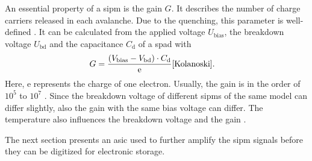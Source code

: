 


An essential property of a \ac{sipm} is the gain $G$.
It describes the number of charge carriers released in each avalanche.
Due to the quenching, this parameter is well-defined \cite{HamamatsuMPPCLit}.
It can be calculated from the applied voltage $U_\text{bias}$, the breakdown voltage $U_\text{bd}$ and the capacitance $C_\text{d}$ of a \ac{spad} with
\begin{align}
	G &= \frac{(V_\text{bias}- V_\text{bd})\cdot C_\text{d}}{\text{e}}\cite{Kolanoski}.
\end{align}
Here, e represents the charge of one electron.
Usually, the gain is in the order of $10^5$ to $10^7$ \cite{ACERBI201916}.
Since the breakdown voltage of different \acp{sipm} of the same model can differ slightly, also the gain with the same bias voltage can differ.
The temperature also influences the breakdown voltage and the gain \cite{HamamatsuMPPCTech}.

The next section presents an \ac{asic} used to further amplify the \ac{sipm} signals before they can be digitized for electronic storage.


